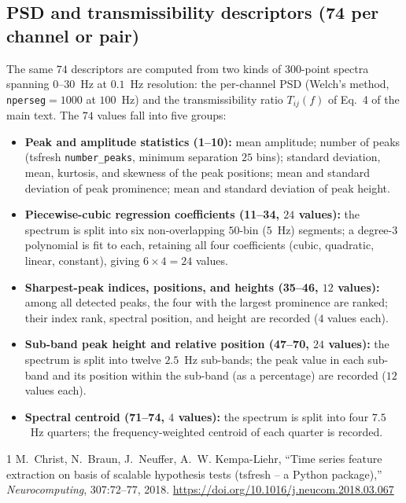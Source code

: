 \documentclass[11pt,a4paper]{article}
\begin{document}
\subsection{PSD and transmissibility descriptors (74 per channel or pair)}

The same $74$ descriptors are computed from two kinds of $300$-point spectra
spanning $0$--$30$~Hz at $0.1$~Hz resolution: the per-channel PSD (Welch's
method, \texttt{nperseg}$=1000$ at $100$~Hz) and the transmissibility ratio
$T_{ij}(f)$ of Eq.~4 of the main text. The $74$ values fall into five
groups:

\begin{itemize}
\item \textbf{Peak and amplitude statistics (1--10):} mean amplitude; number
of peaks (tsfresh \texttt{number\_peaks}, minimum separation $25$ bins);
standard deviation, mean, kurtosis, and skewness of the peak positions;
mean and standard deviation of peak prominence; mean and standard deviation
of peak height.
\item \textbf{Piecewise-cubic regression coefficients (11--34, $24$ values):}
the spectrum is split into six non-overlapping $50$-bin ($5$~Hz) segments;
a degree-$3$ polynomial is fit to each, retaining all four coefficients
(cubic, quadratic, linear, constant), giving $6\times4=24$ values.
\item \textbf{Sharpest-peak indices, positions, and heights (35--46, $12$
values):} among all detected peaks, the four with the largest prominence
are ranked; their index rank, spectral position, and height are recorded
($4$ values each).
\item \textbf{Sub-band peak height and relative position (47--70, $24$
values):} the spectrum is split into twelve $2.5$~Hz sub-bands; the peak
value in each sub-band and its position within the sub-band (as a
percentage) are recorded ($12$ values each).
\item \textbf{Spectral centroid (71--74, $4$ values):} the spectrum is split
into four $7.5$~Hz quarters; the frequency-weighted centroid of each
quarter is recorded.
\end{itemize}

\begin{thebibliography}{1}
M.~Christ, N.~Braun, J.~Neuffer, A.~W. Kempa-Liehr,
``Time series feature extraction on basis of scalable hypothesis tests
(tsfresh -- a Python package),''
\emph{Neurocomputing}, 307:72--77, 2018.
\url{https://doi.org/10.1016/j.neucom.2018.03.067}
\end{thebibliography}
\end{document}
